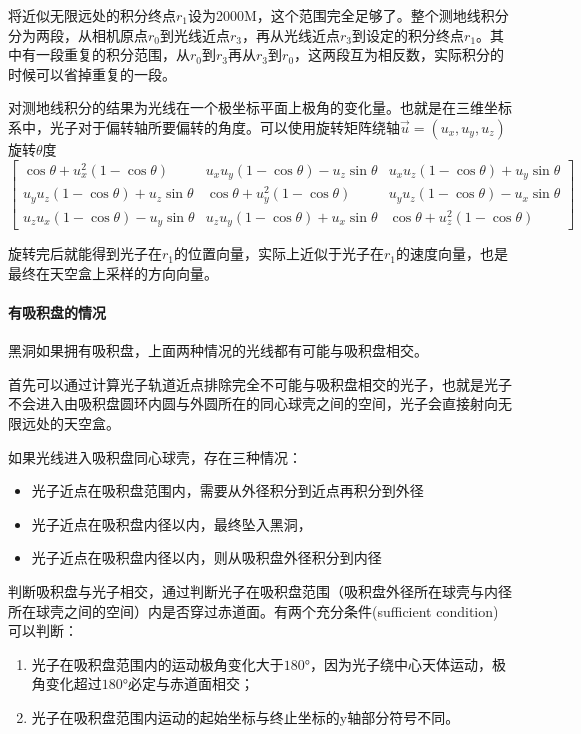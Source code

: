 将近似无限远处的积分终点$r_1$设为2000M，这个范围完全足够了。整个测地线积分分为两段，从相机原点$r_0$到光线近点$r_3$，再从光线近点$r_3$到设定的积分终点$r_1$。其中有一段重复的积分范围，从$r_0$到$r_3$再从$r_3$到$r_0$，这两段互为相反数，实际积分的时候可以省掉重复的一段。

对测地线积分的结果为光线在一个极坐标平面上极角的变化量。也就是在三维坐标系中，光子对于偏转轴所要偏转的角度。可以使用旋转矩阵\cite{rotation_matrix}绕轴$\vec{u}=\left(u_x,u_y,u_z\right)$旋转$\theta$度
\begin{equation}
    \begin{bmatrix}\cos\theta+u_{x}^{2}\left(1-\cos\theta\right)       & u_{x}u_{y}\left(1-\cos\theta\right)-u_{z}\sin\theta & u_{x}u_{z}\left(1-\cos\theta\right)+u_{y}\sin\theta \\
        u_{y}u_{z}\left(1-\cos\theta\right)+u_{z}\sin\theta & \cos\theta+u_{y}^{2}\left(1-\cos\theta\right)       & u_{y}u_{z}\left(1-\cos\theta\right)-u_{x}\sin\theta \\
        u_{z}u_{x}\left(1-\cos\theta\right)-u_{y}\sin\theta & u_{z}u_{y}\left(1-\cos\theta\right)+u_{x}\sin\theta & \cos\theta+u_{z}^{2}\left(1-\cos\theta\right)
    \end{bmatrix}
\end{equation}

旋转完后就能得到光子在$r_1$的位置向量，实际上近似于光子在$r_1$的速度向量，也是最终在天空盒上采样的方向向量。

\paragraph{有吸积盘的情况}
黑洞如果拥有吸积盘，上面两种情况的光线都有可能与吸积盘相交。

首先可以通过计算光子轨道近点排除完全不可能与吸积盘相交的光子，也就是光子不会进入由吸积盘圆环内圆与外圆所在的同心球壳之间的空间，光子会直接射向无限远处的天空盒。

如果光线进入吸积盘同心球壳，存在三种情况：

\begin{itemize}
    \item 光子近点在吸积盘范围内，需要从外径积分到近点再积分到外径
    \item 光子近点在吸积盘内径以内，最终坠入黑洞，
    \item 光子近点在吸积盘内径以内，则从吸积盘外径积分到内径
\end{itemize}

判断吸积盘与光子相交，通过判断光子在吸积盘范围（吸积盘外径所在球壳与内径所在球壳之间的空间）内是否穿过赤道面。有两个充分条件(sufficient condition)可以判断：
\begin{enumerate}
    \item 光子在吸积盘范围内的运动极角变化大于$\ang{180}$，因为光子绕中心天体运动，极角变化超过$\ang{180}$必定与赤道面相交；
    \item 光子在吸积盘范围内运动的起始坐标与终止坐标的y轴部分符号不同。
\end{enumerate}

